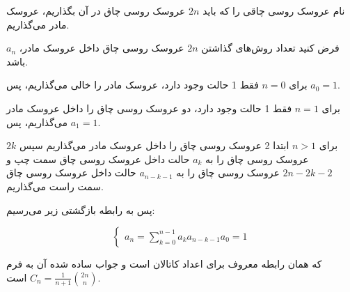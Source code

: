 \p
    نام عروسک روسی چاقی را که باید $2n$ عروسک روسی چاق در آن بگذاریم، عروسک مادر می‌گذاریم. 
    
    فرض کنید تعداد روش‌های گذاشتن $2n$ عروسک روسی چاق داخل عروسک مادر، $a_n$ باشد.
    
    برای $n=0$ فقط 1 حالت وجود دارد، عروسک مادر را خالی می‌گذاریم، پس $a_0=1$.
    
    برای $n=1$ فقط 1 حالت وجود دارد، دو عروسک روسی چاق را داخل عروسک مادر می‌گذاریم، پس $a_1=1$.
    
    برای $n>1$ ابتدا 2 عروسک روسی چاق را داخل عروسک مادر می‌گذاریم سپس $2k$ عروسک روسی چاق را به $a_k$ حالت داخل عروسک روسی چاق سمت چپ و $2n-2k-2$ عروسک روسی چاق را به $a_{n-k-1}$  حالت داخل عروسک روسی چاق سمت راست می‌گذاریم. 
    
    پس به رابطه بازگشتی زیر می‌رسیم:
    
    $$\begin{cases}
        a_n = \sum\limits_{k=0}^{n-1} a_{k}  a_{n-k-1} 
        
        
        a_0 = 1
    \end{cases}$$
    
    که همان رابطه معروف برای اعداد کاتالان است و جواب ساده شده آن به فرم 
    $C_n = \frac{1}{n+1}\binom{2n}{n}$
    است.
